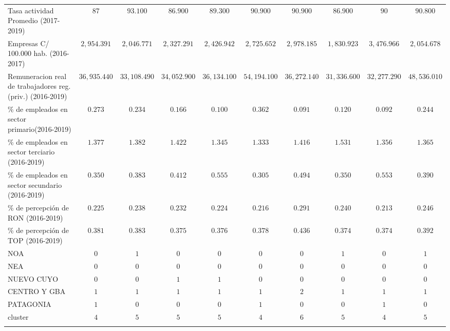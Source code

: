 \documentclass[12pt,a4paper]{article}
\begin{document}
\begin{table}
\begin{tabular}{@{\extracolsep{5pt}} lccccccccc}
Tasa actividad Promedio (2017-2019) & $87$ & $93.100$ & $86.900$ & $89.300$ & $90.900$ & $90.900$ & $86.900$ & $90$ & $90.800$ \\ 
Empresas  C/ 100.000 hab. (2016-2017) & $2,954.391$ & $2,046.771$ & $2,327.291$ & $2,426.942$ & $2,725.652$ & $2,978.185$ & $1,830.923$ & $3,476.966$ & $2,054.678$ \\ 
Remuneracion  real de trabajadores reg. (priv.) (2016-2019) & $36,935.440$ & $33,108.490$ & $34,052.900$ & $36,134.100$ & $54,194.100$ & $36,272.140$ & $31,336.600$ & $32,277.290$ & $48,536.010$ \\ 
\% de empleados en sector primario(2016-2019) & $0.273$ & $0.234$ & $0.166$ & $0.100$ & $0.362$ & $0.091$ & $0.120$ & $0.092$ & $0.244$ \\ 
\% de empleados en sector terciario (2016-2019) & $1.377$ & $1.382$ & $1.422$ & $1.345$ & $1.333$ & $1.416$ & $1.531$ & $1.356$ & $1.365$ \\ 
\% de empleados en sector secundario (2016-2019) & $0.350$ & $0.383$ & $0.412$ & $0.555$ & $0.305$ & $0.494$ & $0.350$ & $0.553$ & $0.390$ \\ 
\% de percepción de RON (2016-2019) & $0.225$ & $0.238$ & $0.232$ & $0.224$ & $0.216$ & $0.291$ & $0.240$ & $0.213$ & $0.246$ \\ 
\% de percepción de TOP  (2016-2019) & $0.381$ & $0.383$ & $0.375$ & $0.376$ & $0.378$ & $0.436$ & $0.374$ & $0.374$ & $0.392$ \\ 
NOA & $0$ & $1$ & $0$ & $0$ & $0$ & $0$ & $1$ & $0$ & $1$ \\ 
NEA & $0$ & $0$ & $0$ & $0$ & $0$ & $0$ & $0$ & $0$ & $0$ \\ 
NUEVO CUYO & $0$ & $0$ & $1$ & $1$ & $0$ & $0$ & $0$ & $0$ & $0$ \\ 
CENTRO Y GBA & $1$ & $1$ & $1$ & $1$ & $1$ & $2$ & $1$ & $1$ & $1$ \\ 
PATAGONIA & $1$ & $0$ & $0$ & $0$ & $1$ & $0$ & $0$ & $1$ & $0$ \\ 
cluster & $4$ & $5$ & $5$ & $5$ & $4$ & $6$ & $5$ & $4$ & $5$ \\ 
\hline \\[-1.8ex] 
\end{tabular}

\end{table} 
\end{document}

